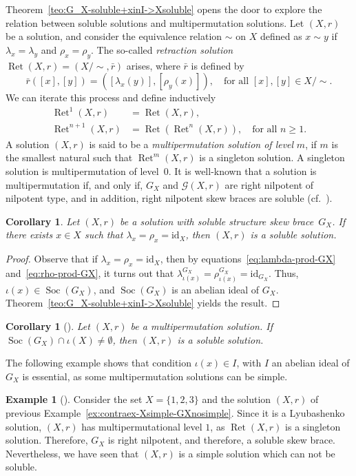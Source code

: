 \documentclass[12pt, a4paper, english]{article}
\newtheorem{corolari}[teorema]{Corollary}
\theoremstyle{definition}
\newtheorem{exemple}[teorema]{Example}
\theoremstyle{remark}
\DeclareMathOperator{\Soc}{Soc}
\DeclareMathOperator{\Ret}{Ret}
\newcounter{cond}
\begin{document}
Theorem~\ref{teo:G_X-soluble+xinI->Xsoluble} opens the door to explore the relation between soluble solutions and multipermutation solutions. Let $(X,r)$ be a solution, and consider the equivalence relation $\sim$ on $X$ defined as $x\sim y$ if $\lambda_x = \lambda_y$ and $\rho_x = \rho_y$. The so-called \emph{retraction solution} $\Ret(X,r) = (X/\sim,\bar{r})$ arises, where $\bar{r}$ is defined by
\[ \bar{r}([x], [y]) = ([\lambda_x(y)], [\rho_y(x)]), \quad \text{for all $[x], [y] \in X/ \sim$}.\] 
We can iterate this process and define inductively
\begin{align*}
\Ret^1(X, r) & = \Ret(X,r),\\
\Ret^{n+1}(X,r) & = \Ret(\Ret^n(X,r)), \quad \text{for all $n\geq 1$.}
\end{align*}
A solution $(X,r)$ is said to be a \emph{multipermutation solution of level} $m$, if $m$ is the smallest natural such that $\Ret^m(X,r)$ is a singleton solution. A singleton solution is multipermutation of level~$0$. It is well-known that a solution is multipermutation if, and only if, $G_X$ and $\mathcal{G}(X,r)$ are right nilpotent of nilpotent type, and in addition, right nilpotent skew braces are soluble (cf.~\cite{BallesterEstebanJimenezPerezC24-solubleskewbraces}).

\begin{corolari}
\label{cor:X-lambda_x=rho_x=id->soluble}
Let $(X,r)$ be a solution with soluble structure skew brace~$G_X$. If there exists $x\in X$ such that $\lambda_x = \rho_x = \mathrm{id}_X$, then $(X,r)$ is a soluble solution.
\end{corolari}

\begin{proof}
Observe that if $\lambda_x = \rho_x = \mathrm{id}_X$, then by equations~\eqref{eq:lambda-prod-GX} and~\eqref{eq:rho-prod-GX}, it turns out that $\lambda_{\iota(x)}^{G_X} = \rho_{\iota(x)}^{G_X} = \mathrm{id}_{G_X}$. Thus, $\iota(x) \in \Soc(G_X)$, and $\Soc(G_X)$ is an abelian ideal of $G_X$. Theorem~\ref{teo:G_X-soluble+xinI->Xsoluble} yields the result.
\end{proof}

\begin{corolari}[{\cite[Corollary~3]{BallesterEstebanJimenezPerezC24-solubleskewbraces}}]
\label{cor:sol_mult->sol_sol}
Let $(X,r)$ be a multipermutation solution. If $\Soc(G_X) \cap \iota(X) \neq \emptyset$, then $(X,r)$ is a soluble solution.
\end{corolari}

The following example shows that condition $\iota(x) \in I$, with $I$ an abelian ideal of $G_X$ is essential, as some multipermutation solutions can be simple.
\begin{exemple}[{\cite[Example~4]{BallesterEstebanJimenezPerezC24-solubleskewbraces}}]
\label{ex:multipermut-nosoluble}
Consider the set $X = \{1,2,3\}$ and the solution $(X,r)$ of previous Example~\ref{ex:contraex-Xsimple-GXnosimple}. Since it is a Lyubashenko solution,  $(X,r)$ has multipermutational level $1$, as $\Ret(X,r)$ is a singleton solution. Therefore, $G_X$ is right nilpotent, and therefore, a soluble skew brace. Nevertheless, we have seen that $(X,r)$ is a simple solution which can not be soluble.
\end{exemple}
\end{document}
